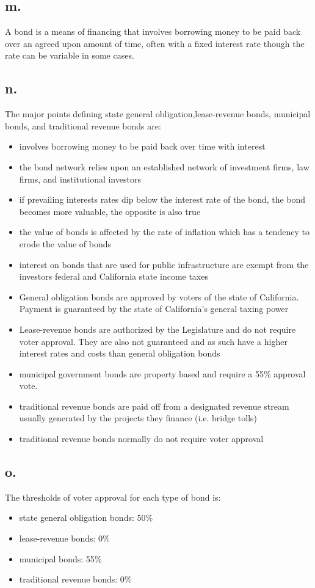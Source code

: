 \documentclass[12pt]{article}
\renewcommand{\=}[1]{\stackrel{#1}{=}} %
\theoremstyle{definition}
\theoremstyle{remark}
\begin{document}
\subsection{m.}
A bond is a means of financing that involves borrowing money to be paid back over an agreed upon amount of time, often with a fixed interest rate though the rate can be variable in some cases.

\subsection{n.}
The major points defining state general obligation,lease-revenue bonds, municipal bonds, and traditional revenue bonds are:
\begin{itemize}
	\item involves borrowing money to be paid back over time with interest
	\item the bond network relies upon an established network of investment firms, law firms, and institutional investors
	\item if prevailing interests rates dip below the interest rate of the bond, the bond becomes more valuable, the opposite is also true
	\item the value of bonds is affected by the rate of inflation which has a tendency to erode the value of bonds
	\item interest on bonds that are used for public infrastructure are exempt from the investors federal and California state income taxes
	\item General obligation bonds are approved by voters of the state of California. Payment is guaranteed by the state of California's general taxing power
	\item Lease-revenue bonds are authorized by the Legislature and do not require voter approval. They are also not guaranteed and as such have a higher interest rates and costs than general obligation bonds
	\item municipal government bonds are property based and require a 55\% approval vote.
	\item traditional revenue bonds are paid off from a designated revenue stream usually generated by the projects they finance (i.e. bridge tolls)
	\item traditional revenue bonds normally do not require voter approval
\end{itemize}

\subsection{o.}
The thresholds of voter approval for each type of bond is:
\begin{itemize}
	\item state general obligation bonds: 50\%
	\item lease-revenue bonds: 0\%
	\item municipal bonds: 55\%
	\item traditional revenue bonds: 0\%
\end{itemize}
\end{document}
